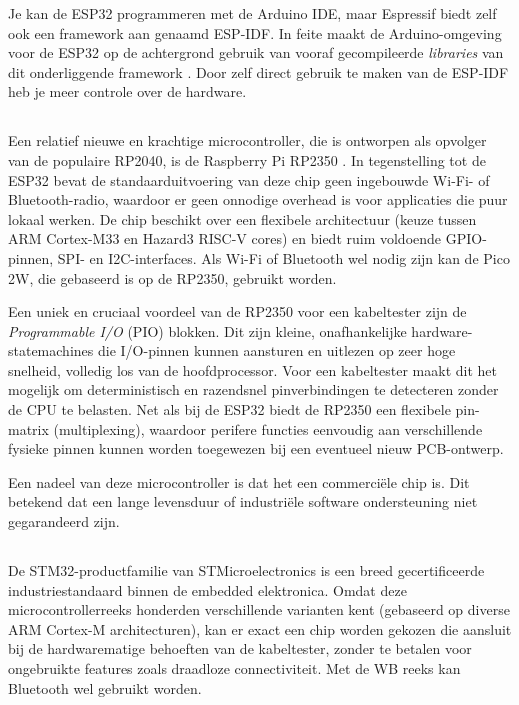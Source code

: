 Je kan de ESP32 programmeren met de Arduino IDE, maar Espressif biedt zelf ook een framework aan genaamd \gls{ESP-IDF}. In feite maakt de Arduino-omgeving voor de ESP32 op de achtergrond gebruik van vooraf gecompileerde \textit{libraries} van dit onderliggende framework \autocite{EspressifSystems2024}. Door zelf direct gebruik te maken van de \gls{ESP-IDF} heb je meer controle over de hardware.

\subsection{}%
\label{ssec:RP2350}

Een relatief nieuwe en krachtige microcontroller, die is ontworpen als opvolger van de populaire RP2040, is de Raspberry Pi RP2350 \autocite{RPL2025}. In tegenstelling tot de ESP32 bevat de standaarduitvoering van deze chip geen ingebouwde Wi-Fi- of Bluetooth-radio, waardoor er geen onnodige overhead is voor applicaties die puur lokaal werken. De chip beschikt over een flexibele architectuur (keuze tussen ARM Cortex-M33 en Hazard3 RISC-V cores) en biedt ruim voldoende \acrshort{GPIO}-pinnen, \acrshort{SPI}- en \acrshort{I2C}-interfaces. Als Wi-Fi of Bluetooth wel nodig zijn kan de Pico 2W, die gebaseerd is op de RP2350, gebruikt worden.

Een uniek en cruciaal voordeel van de RP2350 voor een kabeltester zijn de \textit{Programmable I/O} (PIO) blokken. Dit zijn kleine, onafhankelijke hardware-statemachines die I/O-pinnen kunnen aansturen en uitlezen op zeer hoge snelheid, volledig los van de hoofdprocessor. Voor een kabeltester maakt dit het mogelijk om deterministisch en razendsnel pinverbindingen te detecteren zonder de CPU te belasten. Net als bij de ESP32 biedt de RP2350 een flexibele pin-matrix (multiplexing), waardoor perifere functies eenvoudig aan verschillende fysieke pinnen kunnen worden toegewezen bij een eventueel nieuw PCB-ontwerp.

Een nadeel van deze microcontroller is dat het een commerciële chip is. Dit betekend dat een lange levensduur of industriële software ondersteuning niet gegarandeerd zijn.

\subsection{}%
\label{ssec:STM32}

De STM32-productfamilie van STMicroelectronics \autocite{STMicroelectronics2025} is een breed gecertificeerde industriestandaard binnen de embedded elektronica. Omdat deze microcontrollerreeks honderden verschillende varianten kent (gebaseerd op diverse ARM Cortex-M architecturen), kan er exact een chip worden gekozen die aansluit bij de hardwarematige behoeften van de kabeltester, zonder te betalen voor ongebruikte features zoals draadloze connectiviteit. Met de WB reeks kan Bluetooth wel gebruikt worden.

